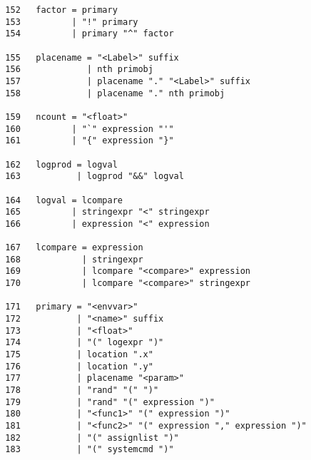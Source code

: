 \documentclass[11pt]{article}
\begin{document}
\begin{verbatim}
  152   factor = primary 
  153          | "!" primary 
  154          | primary "^" factor 

  155   placename = "<Label>" suffix 
  156             | nth primobj 
  157             | placename "." "<Label>" suffix 
  158             | placename "." nth primobj 

  159   ncount = "<float>" 
  160          | "`" expression "'" 
  161          | "{" expression "}" 

  162   logprod = logval 
  163           | logprod "&&" logval 

  164   logval = lcompare 
  165          | stringexpr "<" stringexpr 
  166          | expression "<" expression 

  167   lcompare = expression 
  168            | stringexpr 
  169            | lcompare "<compare>" expression 
  170            | lcompare "<compare>" stringexpr 

  171   primary = "<envvar>" 
  172           | "<name>" suffix 
  173           | "<float>" 
  174           | "(" logexpr ")" 
  175           | location ".x" 
  176           | location ".y" 
  177           | placename "<param>" 
  178           | "rand" "(" ")" 
  179           | "rand" "(" expression ")" 
  180           | "<func1>" "(" expression ")" 
  181           | "<func2>" "(" expression "," expression ")" 
  182           | "(" assignlist ")" 
  183           | "(" systemcmd ")" 
\end{verbatim}
\end{document}
